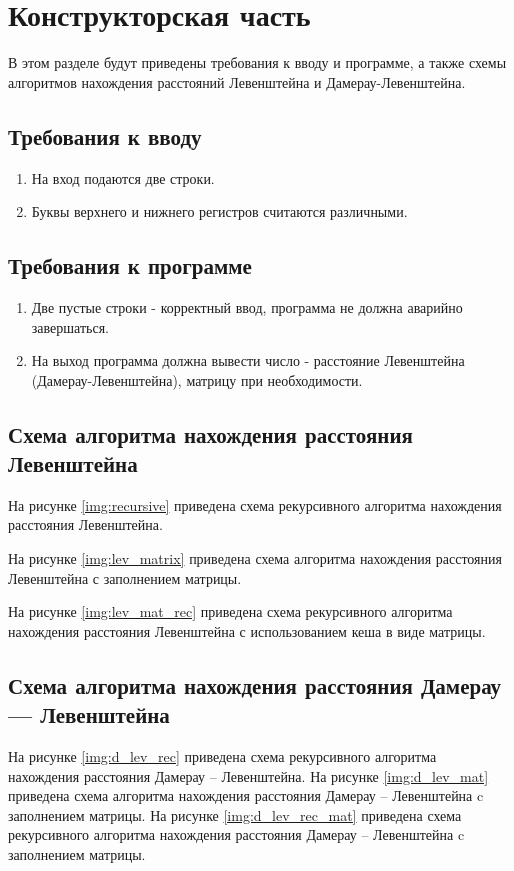 \chapter{Конструкторская часть}
В этом разделе будут приведены требования к вводу и программе, а также схемы алгоритмов нахождения расстояний Левенштейна и Дамерау-Левенштейна.

\section{Требования к вводу}
\begin{enumerate}
	\item На вход подаются две строки.
	\item Буквы верхнего и нижнего регистров считаются различными.
\end{enumerate}

\section{Требования к программе}
\begin{enumerate}
	\item Две пустые строки - корректный ввод, программа не должна аварийно завершаться.
	\item На выход программа должна вывести число - расстояние Левенштейна (Дамерау-Левенштейна), матрицу при необходимости.
\end{enumerate}

\section{Схема алгоритма нахождения расстояния Левенштейна}

На рисунке \ref{img:recursive} приведена схема рекурсивного алгоритма нахождения расстояния Левенштейна.

На рисунке \ref{img:lev_matrix} приведена схема алгоритма нахождения расстояния Левенштейна с заполнением матрицы.

На рисунке \ref{img:lev_mat_rec} приведена схема рекурсивного алгоритма нахождения расстояния Левенштейна с использованием кеша в виде матрицы.

\section{Схема алгоритма нахождения расстояния Дамерау — Левенштейна}

На рисунке \ref{img:d_lev_rec} приведена схема рекурсивного алгоритма нахождения расстояния Дамерау -- Левенштейна.
На рисунке \ref{img:d_lev_mat} приведена схема алгоритма нахождения расстояния Дамерау -- Левенштейна c заполнением матрицы.
На рисунке \ref{img:d_lev_rec_mat} приведена схема рекурсивного алгоритма нахождения расстояния Дамерау -- Левенштейна c заполнением матрицы.

